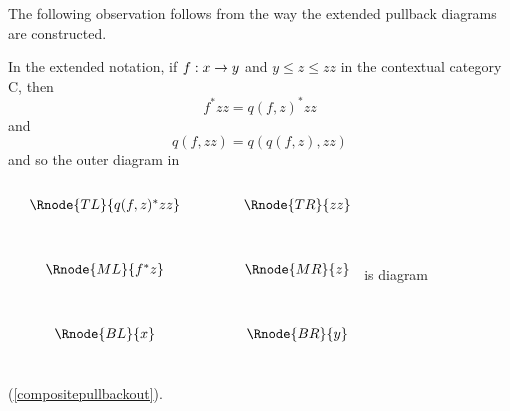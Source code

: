 The following observation
follows from the way the extended pullback diagrams are constructed. 
\begin{lemma}
In the extended notation, if $f: x \rightarrow y$ 
and $y \leq z \leq zz$ in the contextual category C, then
\begin{equation}
f^*zz = q(f, z)^*zz
\end{equation}
 and 
\begin{equation}
q(f, zz) = q(q(f, z), zz)
\end{equation}
and so the outer diagram in
\renewcommand{\pc}[2]{p_{#1,#2}}  %
$
\begin{array}{ccp{.9cm}c}
\\[0.25cm]
&\Rnode{TL}{q(f,z)^*zz} & & \Rnode{TR}{zz}\\ [1.2cm]
&\Rnode{ML}{f^*z} & & \Rnode{MR}{z}\\ [1.2cm]
&\Rnode{BL}{x}         & & \Rnode{BR}{y} \\[1.0cm]
\end{array}
$
is diagram (\ref{compositepullbackout}). 
\end{lemma}

